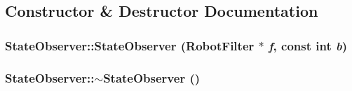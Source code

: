 \subsection{Constructor \& Destructor Documentation}
\hypertarget{class_state_observer_a2c4bfeb55e24f75987cadadc3f89ecca}{
\subsubsection[{StateObserver}]{\setlength{\rightskip}{0pt plus 5cm}StateObserver::StateObserver ({\bf RobotFilter} $\ast$ {\em f}, \/  const int {\em b})}}
\label{class_state_observer_a2c4bfeb55e24f75987cadadc3f89ecca}
\hypertarget{class_state_observer_af4bf0f323eff464401227a01db686edb}{
\subsubsection[{$\sim$StateObserver}]{\setlength{\rightskip}{0pt plus 5cm}StateObserver::$\sim$StateObserver ()}}
\label{class_state_observer_af4bf0f323eff464401227a01db686edb}


